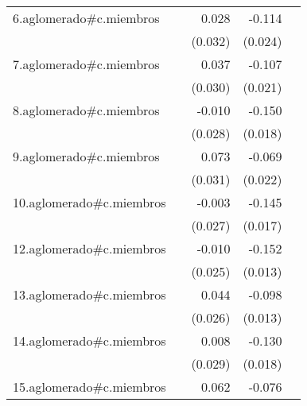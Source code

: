 {\begin{longtable}{l*{4}{D{.}{.}{-1}}}
\addlinespace
6.aglomerado#c.miembros&                     &       0.028         &      -0.114\sym{***}&                     \\
            &                     &     (0.032)         &     (0.024)         &                     \\
\addlinespace
7.aglomerado#c.miembros&                     &       0.037         &      -0.107\sym{***}&                     \\
            &                     &     (0.030)         &     (0.021)         &                     \\
\addlinespace
8.aglomerado#c.miembros&                     &      -0.010         &      -0.150\sym{***}&                     \\
            &                     &     (0.028)         &     (0.018)         &                     \\
\addlinespace
9.aglomerado#c.miembros&                     &       0.073\sym{*}  &      -0.069\sym{**} &                     \\
            &                     &     (0.031)         &     (0.022)         &                     \\
\addlinespace
10.aglomerado#c.miembros&                     &      -0.003         &      -0.145\sym{***}&                     \\
            &                     &     (0.027)         &     (0.017)         &                     \\
\addlinespace
12.aglomerado#c.miembros&                     &      -0.010         &      -0.152\sym{***}&                     \\
            &                     &     (0.025)         &     (0.013)         &                     \\
\addlinespace
13.aglomerado#c.miembros&                     &       0.044         &      -0.098\sym{***}&                     \\
            &                     &     (0.026)         &     (0.013)         &                     \\
\addlinespace
14.aglomerado#c.miembros&                     &       0.008         &      -0.130\sym{***}&                     \\
            &                     &     (0.029)         &     (0.018)         &                     \\
\addlinespace
15.aglomerado#c.miembros&                     &       0.062\sym{*}  &      -0.076\sym{***}&                     \\

\end{longtable}}
